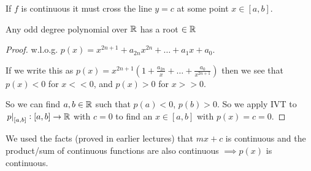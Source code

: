 \documentclass[10pt,twoside]{scrartcl}
\begin{document}
If $f$ is continuous it must cross the line $y=c$ at some point $x \in [a,b]$. 

\begin{corollary}
Any odd degree polynomial over $\mathbb{R}$ has a root $\in\mathbb{R}$	
\end{corollary}
\begin{proof}
w.l.o.g. $p(x) = x^{2n+1} + a_{2n}x^{2n} + \dots + a_1x + a_0$.

If we write this as $p(x) = x^{2n+1}(1 + \frac{a_{2n}}{x} + \dots + \frac{a_0}{x^{2n+1}})$ then we see that $p(x) < 0$ for $x << 0$, and $p(x) > 0$ for $x>>0$. 

So we can find $a,b \in\mathbb{R}$ such that $p(a) < 0$,  $p(b) > 0$. So we apply IVT to $\left.p\right|_{[a,b]}: [a,b] \to \mathbb{R}$ with $c = 0$ to find an $x \in [a,b]$ with $p(x) = c = 0$.
\end{proof}

We used the facts (proved in earlier lectures) that $mx +c$ is continuous and the product/sum of continuous functions are also continuous $\implies p(x)$ is continuous. 
\end{document}
